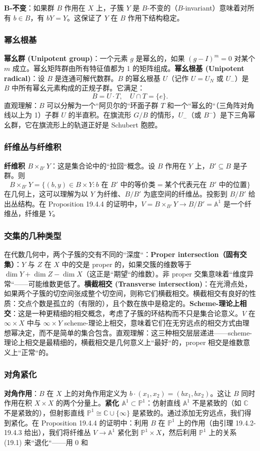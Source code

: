 \textbf{B-不变}：如果群 $B$ 作用在 $X$ 上，子簇 $Y$ 是 $B$-不变的（$B$-invariant）意味着对所有 $b \in B$，有 $bY = Y$。这保证了 $Y$ 在 $B$ 作用下结构稳定。\subsubsection{幂幺根基}\textbf{幂幺群 (Unipotent group)}：一个元素 $g$ 是幂幺的，如果 $(g - I)^m = 0$ 对某个 $m$ 成立。幂幺矩阵群由所有特征值都为 1 的矩阵组成。\textbf{幂幺根基 (Unipotent radical)}：设 $B$ 是连通可解代数群。$B$ 的幂幺根基 $U$（记作 $U = U_N$ 或 $U_-$）是 $B$ 中所有幂幺元素构成的正规子群。它满足：\[B = U \cdot T, \quad U \cap T = \{e\}.\]直观理解：$B$ 可以分解为一个``阿贝尔的``环面子群 $T$ 和一个``幂幺的``（三角阵对角线以上为 1）子群 $U$ 的半直积。在旗流形 $G/B$ 的情形，$U_-$（或 $B^-$）是下三角幂幺群，它在旗流形上的轨道正好是 Schubert 胞腔。\subsubsection{纤维丛与纤维积}\textbf{纤维积 $B \times_{B'} Y$}：这是集合论中的``拉回``概念。设 $B$ 作用在 $Y$ 上，$B' \subseteq B$ 是子群。则\[B \times_{B'} Y = \{(b, y) \in B \times Y : b \text{ 在 } B' \text{ 中的等价类} = \text{某个代表元在 } B' \text{ 中的位置}\}\]在几何上，这可以理解为以 $Y$ 为纤维、$B/B'$ 为底空间的纤维丛。投影到 $B/B'$ 给出丛结构。在 Proposition 19.4.4 的证明中，$V = B \times_{B'} Y \to B/B' = \mathbb{A}^1$ 是一个纤维丛，纤维是 $Y$。\subsubsection{交集的几种类型}在代数几何中，两个子簇的交有不同的``深度``：\textbf{Proper intersection（固有交集）}：$Y$ 与 $Z$ 在 $X$ 中的交是 proper 的，如果交簇的维数等于 $\dim Y + \dim Z - \dim X$（这正是``期望``的维数）。非 proper 交集意味着``维度异常``——可能维数更低了。\textbf{横截相交 (Transverse intersection)}：在光滑点处，如果两个子簇的切空间张成整个切空间，则称它们横截相交。横截相交有良好的性质：交点个数是孤立的（有限的），且个数在族中是稳定的。\textbf{Scheme-理论上相交}：这是一种更精细的相交概念，考虑了子簇的环结构而不只是集合论意义。$V$ 在 $\infty \times X$ 中与 $\infty \times Y$ scheme-理论上相交，意味着它们在无穷远点的相交方式由理想幂决定，而不是简单的集合包含。直观理解：这三种相交层层递进——scheme-理论上相交是最精细的，横截相交是几何意义上``最好``的，proper 相交是维数意义上``正常``的。\subsubsection{对角紧化}\textbf{对角作用}：$B$ 在 $X$ 上的对角作用定义为 $b \cdot (x_1, x_2) = (b x_1, b x_2)$。这让 $B$ 同时作用在积 $X \times X$ 的两个分量上。\textbf{紧化 $\mathbb{A}^1 \subset \mathbb{P}^1$}：仿射直线 $\mathbb{A}^1$ 不是紧致的（如 $\mathbb{C}$ 不是紧致的），但射影直线 $\mathbb{P}^1 \cong \mathbb{C} \cup \{\infty\}$ 是紧致的。通过添加无穷远点，我们得到紧化。在 Proposition 19.4.4 的证明中：利用 $B$ 在 $\mathbb{P}^1$ 上的作用（由引理 19.4.2-19.4.3 给出），我们将纤维丛 $V \to \mathbb{A}^1$ 紧化到 $\mathbb{P}^1 \times X$，然后利用 $\mathbb{P}^1$ 上的关系 (19.1) 来``退化``——用 $0$ 和 
